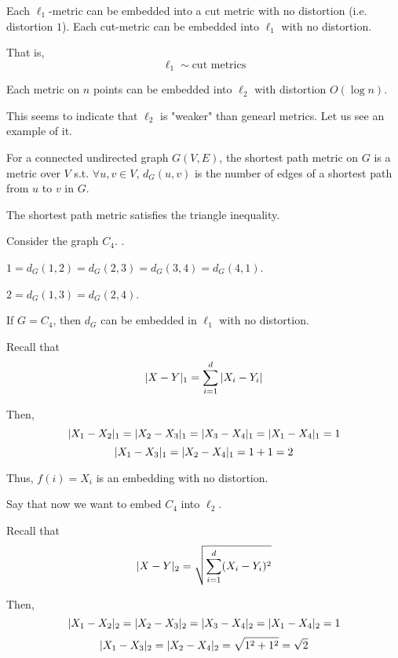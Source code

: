     \begin{lemma}
        Each $\ell_1$-metric can be embedded into a cut metric with no distortion (i.e. distortion $1$).
        Each cut-metric can be embedded into $\ell_1$ with no distortion.
    \end{lemma}

    That is,
    \[ \ell_1 \sim \text{cut metrics} \]

    \begin{theorem}[Bourgain]
        Each metric on $n$ points can be embedded into $\ell_2$ with distortion $O(\log n)$.
    \end{theorem}

    This seems to indicate that $\ell_2$ is "weaker" than genearl metrics.
    Let us see an example of it.

    \begin{definition}
        For a connected undirected graph $G(V,E)$, the shortest path metric on $G$ is a metric over $V$ s.t.
        $\forall u,v \in V$, $d_G(u,v)$ is the number of edges of a shortest path from $u$ to $v$ in $G$.
    \end{definition}

    \begin{observation}
        The shortest path metric satisfies the triangle inequality.
    \end{observation}

    Consider the graph $C_4$.
    .

    $1 = d_G(1,2) = d_G(2,3) = d_G(3,4) = d_G(4,1)$.

    $2 = d_G(1,3) = d_G(2,4)$.

    If $G = C_4$, then $d_G$ can be embedded in $\ell_1$ with no distortion.

    Recall that
    \[ \vert X-Y \vert_1 = \sum_{i=1}^{d} \vert X_i - Y_i \vert \]

    \toalign
    Then,
    \[ \vert X_1 - X_2 \vert_1 = \vert X_2 - X_3 \vert_1 = \vert X_3 - X_4 \vert_1 = \vert X_1 - X_4 \vert_1 = 1 \]
    \[ \vert X_1 - X_3 \vert_1 = \vert X_2 - X_4 \vert_1 = 1+1 = 2 \]

    Thus, $f(i) = X_i$ is an embedding with no distortion.

    Say that now we want to embed $C_4$ into $\ell_2$.

    Recall that
    \[ \vert X-Y \vert_2 = \sqrt{\sum_{i=1}^{d} (X_i - Y_i)^2} \]

    \toalign
    Then,
    \[ \vert X_1 - X_2 \vert_2 = \vert X_2 - X_3 \vert_2 = \vert X_3 - X_4 \vert_2 = \vert X_1 - X_4 \vert_2 = 1 \]
    \[ \vert X_1 - X_3 \vert_2 = \vert X_2 - X_4 \vert_2 = \sqrt{1^2 + 1^2} = \sqrt{2} \]


